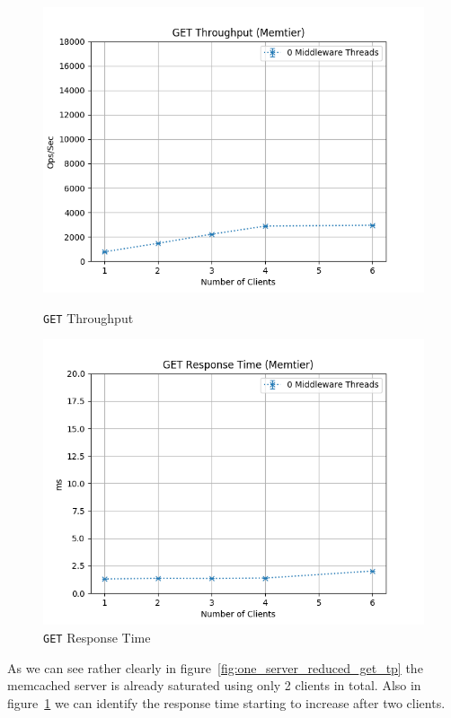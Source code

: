 \documentclass[11pt,a4paper]{article}
\begin{document}
\begin{figure}[H]
    \centering
    \begin{minipage}{0.5\textwidth}
        \centering
        \includegraphics[width=\textwidth]{../illustrations/plots/1_1_1_one_server_reduced/0-1/memtier_get_tp_s.png}
        \caption{\texttt{GET} Throughput}
        \label{fig:one_server_reduced_get_tp}
    \end{minipage}\hfill
    \begin{minipage}{0.5\textwidth}
        \centering
        \includegraphics[width=\textwidth]{../illustrations/plots/1_1_1_one_server_reduced/0-1/memtier_get_rt_ms.png}
        \caption{\texttt{GET} Response Time}
        \label{fig:one_server_reduced_get_rt}
    \end{minipage}
\end{figure}
%
As we can see rather clearly in figure~\ref{fig:one_server_reduced_get_tp} the memcached server is already saturated using only 2 clients in total.
%
Also in figure~\ref{fig:one_server_reduced_get_rt} we can identify the response time starting to increase after two clients.
%
\end{document}
